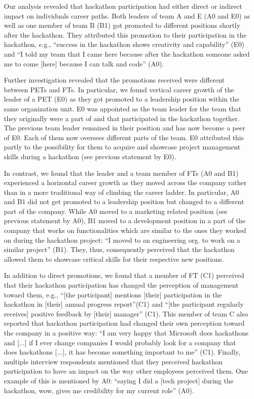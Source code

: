 \documentclass{hcij}
\begin{document}
Our analysis revealed that hackathon participation had either direct or indirect impact on individuals career paths. Both leaders of team A and E (A0 and E0) as well as one member of team B (B1) got promoted to different positions shortly after the hackathon. They attributed this promotion to their participation in the hackathon, e.g., “success in the hackathon shows creativity and capability” (E0) and “I told my team that I came here because after the hackathon someone asked me to come [here] because I can talk and code” (A0).

Further investigation revealed that the promotions received were different between PETs and FTs. In particular, we found vertical career growth of the leader of a PET (E0) as they got promoted to a leadership position within the same organization unit. E0 was appointed as the team leader for the team that they originally were a part of and that participated in the hackathon together. The previous team leader remained in their position and has now become a peer of E0. Each of them now oversees different parts of the team. E0 attributed this partly to the possibility for them to acquire and showcase project management skills during a hackathon (see previous statement by E0).

In contrast, we found that the leader and a team member of FTs (A0 and B1) experienced a horizontal career growth as they moved across the company rather than in a more traditional way of climbing the career ladder. In particular, A0 and B1 did not get promoted to a leadership position but changed to a different part of the company. While A0 moved to a marketing related position (see previous statement by A0), B1 moved to a development position in a part of the company that works on functionalities which are similar to the ones they worked on during the hackathon project: “I moved to an engineering org. to work on a similar project” (B1). They, thus, consequently perceived that the hackathon allowed them to showcase critical skills for their respective new positions.

In addition to direct promotions, we found that a member of FT (C1) perceived that their hackathon participation has changed the perception of management toward them, e.g., “[the participant] mentions [their] participation in the hackathon in [their] annual progress report”(C1) and “[the participant regularly receives] positive feedback by [their] manager” (C1). This member of team C also reported that hackathon participation had changed their own perception toward the company in a positive way: “I am very happy that Microsoft does hackathons and [...] if I ever change companies I would probably look for a company that does hackathons [...], it has become something important to me” (C1). Finally, multiple interview respondents mentioned that they perceived hackathon participation to have an impact on the way other employees perceived them. One example of this is mentioned by A0: “saying I did a [tech project] during the hackathon, wow, gives me credibility for my current role” (A0).
\end{document}
